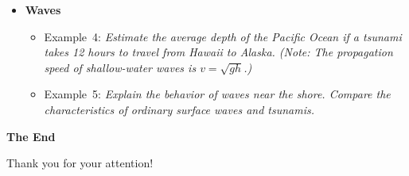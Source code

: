 \documentclass[t,aspectratio=169]{beamer}
\begin{document}
\begin{frame}
\begin{itemize}
\pagebreak
\item \textbf{Waves}
\begin{itemize}
\item Example~4: \textit{Estimate the average depth of the Pacific Ocean if a tsunami takes 12 hours to travel from Hawaii to Alaska. (Note: The propagation speed of shallow-water waves is $v=\sqrt{gh}$.)}
\item Example~5: \textit{Explain the behavior of waves near the shore. Compare the characteristics of ordinary surface waves and tsunamis.}
\end{itemize}
\end{itemize}
\end{frame}


\begin{frame}

\vfill
\begin{center}
\textbf{\huge The End}

\bigskip
Thank you for your attention!
\end{center}
\vfill
\end{frame}
\end{document}

